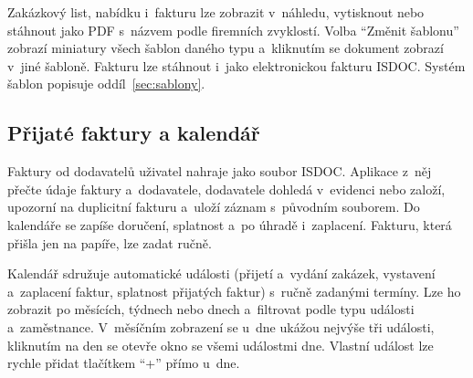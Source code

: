 Zakázkový list, nabídku i~fakturu lze zobrazit v~náhledu, vytisknout nebo stáhnout jako PDF s~názvem podle firemních zvyklostí. Volba \enquote{Změnit šablonu} zobrazí miniatury všech šablon daného typu a~kliknutím se dokument zobrazí v~jiné šabloně. Fakturu lze stáhnout i~jako elektronickou fakturu ISDOC. Systém šablon popisuje oddíl~\ref{sec:sablony}.

\subsection{Přijaté faktury a kalendář}\label{sec:prijate-faktury}

Faktury od dodavatelů uživatel nahraje jako soubor ISDOC. Aplikace z~něj přečte údaje faktury a~dodavatele, dodavatele dohledá v~evidenci nebo založí, upozorní na duplicitní fakturu a~uloží záznam s~původním souborem. Do kalendáře se zapíše doručení, splatnost a~po úhradě i~zaplacení. Fakturu, která přišla jen na papíře, lze zadat ručně.

Kalendář sdružuje automatické události (přijetí a~vydání zakázek, vystavení a~zaplacení faktur, splatnost přijatých faktur) s~ručně zadanými termíny. Lze ho zobrazit po měsících, týdnech nebo dnech a~filtrovat podle typu události a~zaměstnance. V~měsíčním zobrazení se u~dne ukážou nejvýše tři události, kliknutím na den se otevře okno se všemi událostmi dne. Vlastní událost lze rychle přidat tlačítkem \enquote{+} přímo u~dne.
